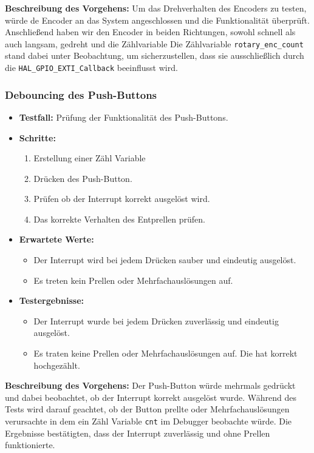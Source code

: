 \textbf{Beschreibung des Vorgehens:}
Um das Drehverhalten des Encoders zu testen, würde de Encoder an das System angeschlossen und die Funktionalität überprüft. Anschließend haben wir den Encoder in beiden Richtungen, sowohl schnell als auch langsam, gedreht und die Zählvariable 
Die Zählvariable \texttt{rotary\_enc\_count} stand dabei unter Beobachtung, um sicherzustellen, dass sie ausschließlich durch die \texttt{HAL\_GPIO\_EXTI\_Callback} beeinflusst wird.


\subsubsection{Debouncing des Push-Buttons}
\begin{itemize}
	\item \textbf{Testfall:} Prüfung der Funktionalität des Push-Buttons.
	\item \textbf{Schritte:}
	\begin{enumerate}
		\item Erstellung einer Zähl Variable 
		\item Drücken des Push-Button.
		\item Prüfen ob der Interrupt korrekt ausgelöst wird.
		\item Das korrekte Verhalten des Entprellen prüfen.
	\end{enumerate}
	\item \textbf{Erwartete Werte:}
	\begin{itemize}
		\item Der Interrupt wird bei jedem Drücken sauber und eindeutig ausgelöst.
		\item Es treten kein Prellen oder Mehrfachauslösungen auf.
	\end{itemize}
	\item \textbf{Testergebnisse:}
	\begin{itemize}
		\item Der Interrupt wurde bei jedem Drücken zuverlässig und eindeutig ausgelöst.
		\item Es traten keine Prellen oder Mehrfachauslösungen auf. Die  hat korrekt hochgezählt.
	\end{itemize}
\end{itemize}


\textbf{Beschreibung des Vorgehens:}
Der Push-Button würde mehrmals gedrückt und dabei beobachtet, ob der Interrupt korrekt ausgelöst wurde. Während des Tests wird darauf geachtet, ob der Button prellte oder Mehrfachauslösungen verursachte in dem ein Zähl Variable \texttt{cnt} im Debugger beobachte würde. Die Ergebnisse bestätigten, dass der Interrupt zuverlässig und ohne Prellen funktionierte.

